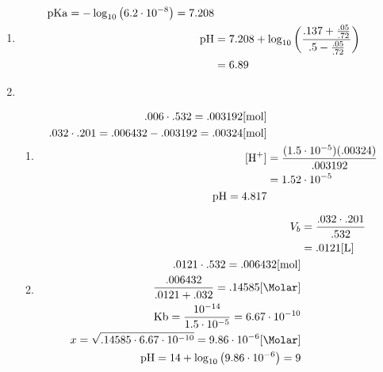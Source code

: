 \documentclass[12pt]{article}
\begin{document}
\begin{enumerate}
  \item {}

    \begin{equation}
      \begin{split}
        \ce{pKa}=-\log_{10}\left( 6.2\cdot10^{-8} \right)=7.208\\
        \ce{pH}&=7.208+\log_{10}\left( \frac{.137+\frac{.05}{.72}}{.5-\frac{.05}{.72}} \right)\\
        &= 6.89
      \end{split}
      \label{8}
    \end{equation}

  \item

    \begin{enumerate}

      \item 

    \begin{equation}
      \begin{split}
        .006\cdot.532=.003192[\si{\mole}]\\
        .032\cdot.201=.006432-.003192=.00324[\si{\mole}]\\
        [\ce{H+}]&=\frac{(1.5\cdot10^{-5})(.00324)}{.003192}\\
        &= 1.52\cdot10^{-5}\\
        \ce{pH}=4.817
      \end{split}
      \label{9}
    \end{equation}

      \item 

    \begin{equation}
      \begin{split}
        V_b&= \frac{.032\cdot.201}{.532}\\
        &= .0121[\si{\liter}]\\
        .0121\cdot.532=.006432[\si{\mole}]\\
        \frac{.006432}{.0121+.032}=.14585[\si{\Molar}]\\
        \ce{Kb}=\frac{10^{-14}}{1.5\cdot10^{-5}}=6.67\cdot10^{-10}\\
        x=\sqrt{.14585\cdot6.67\cdot10^{-10}}=9.86\cdot10^{-6}[\si{\Molar}]\\
        \ce{pH}=14+\log_{10}\left( 9.86\cdot10^{-6} \right)=9
      \end{split}
      \label{10}
    \end{equation}


\end{enumerate}
\end{enumerate}
\end{document}
